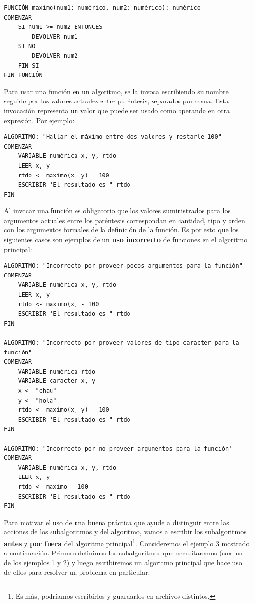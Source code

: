 \documentclass[
]{book}
\begin{document}
\begin{verbatim}
FUNCIÓN maximo(num1: numérico, num2: numérico): numérico
COMENZAR
    SI num1 >= num2 ENTONCES
        DEVOLVER num1
    SI NO
        DEVOLVER num2
    FIN SI
FIN FUNCIÓN
\end{verbatim}

Para usar una función en un algoritmo, se la invoca escribiendo su nombre seguido por los valores actuales entre paréntesis, separados por coma. Esta invocación representa un valor que puede ser usado como operando en otra expresión. Por ejemplo:

\begin{verbatim}
ALGORITMO: "Hallar el máximo entre dos valores y restarle 100"
COMENZAR
    VARIABLE numérica x, y, rtdo
    LEER x, y
    rtdo <- maximo(x, y) - 100
    ESCRIBIR "El resultado es " rtdo
FIN
\end{verbatim}

Al invocar una función es obligatorio que los valores suministrados para los argumentos actuales entre los paréntesis correspondan en cantidad, tipo y orden con los argumentos formales de la definición de la función. Es por esto que los siguientes casos son ejemplos de un \textbf{uso incorrecto} de funciones en el algoritmo principal:

\begin{verbatim}
ALGORITMO: "Incorrecto por proveer pocos argumentos para la función"
COMENZAR
    VARIABLE numérica x, y, rtdo
    LEER x, y
    rtdo <- maximo(x) - 100
    ESCRIBIR "El resultado es " rtdo
FIN

ALGORITMO: "Incorrecto por proveer valores de tipo caracter para la función"
COMENZAR
    VARIABLE numérica rtdo
    VARIABLE caracter x, y
    x <- "chau"
    y <- "hola"
    rtdo <- maximo(x, y) - 100
    ESCRIBIR "El resultado es " rtdo
FIN

ALGORITMO: "Incorrecto por no proveer argumentos para la función"
COMENZAR
    VARIABLE numérica x, y, rtdo
    LEER x, y
    rtdo <- maximo - 100
    ESCRIBIR "El resultado es " rtdo
FIN
\end{verbatim}

Para motivar el uso de una buena práctica que ayude a distinguir entre las acciones de los subalgoritmos y del algoritmo, vamos a escribir los subalgoritmos \textbf{antes} y \textbf{por fuera} del algoritmo principal\footnote{Es más, podríamos escribirlos y guardarlos en archivos distintos.}. Consideremos el ejemplo 3 mostrado a continuación. Primero definimos los subalgoritmos que necesitaremos (son los de los ejemplos 1 y 2) y luego escribiremos un algoritmo principal que hace uso de ellos para resolver un problema en particular:
\end{document}
